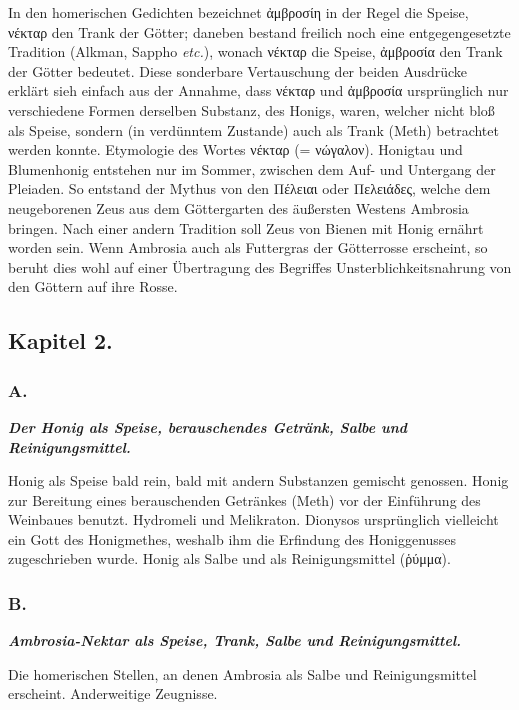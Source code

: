 \documentclass[a4paper, 11pt, oneside]{article}
\begin{document}
In den homerischen Gedichten bezeichnet ἀμβροσίη in der Regel die Speise, νέκταρ den Trank der Götter; daneben bestand freilich noch eine entgegengesetzte Tradition (Alkman, Sappho \emph{etc.}), wonach νέκταρ die Speise, ἀμβροσία den Trank der Götter bedeutet. Diese sonderbare Vertauschung der beiden Ausdrücke erklärt sieh einfach aus der Annahme, dass νέκταρ und ἀμβροσία ursprünglich nur verschiedene Formen derselben Substanz, des Honigs, waren, welcher nicht bloß als Speise, sondern (in verdünntem Zustande) auch als Trank (Meth) betrachtet werden konnte. Etymologie des Wortes νέκταρ (= νώγαλον). Honigtau und Blumenhonig entstehen nur im Sommer, zwischen dem Auf- und Untergang der Pleiaden. So entstand der Mythus von den Πέλειαι oder Πελειάδες, welche dem neugeborenen Zeus aus dem Göttergarten des äußersten Westens Ambrosia bringen. Nach einer andern Tradition soll Zeus von Bienen mit Honig ernährt worden sein. Wenn Ambrosia auch als Futtergras der Götterrosse erscheint, so beruht dies wohl auf einer Übertragung des Begriffes Unsterblichkeitsnahrung von den Göttern auf ihre Rosse.

\subsection*{Kapitel 2.}

\subsubsection*{A.}

\textbf{\emph{Der Honig als Speise, berauschendes Getränk, Salbe und Reinigungsmittel.}}

Honig als Speise bald rein, bald mit andern Substanzen gemischt genossen. Honig zur Bereitung eines berauschenden Getränkes (Meth) vor der Einführung des Weinbaues benutzt. Hydromeli und Melikraton. Dionysos ursprünglich vielleicht ein Gott des Honigmethes, weshalb ihm die Erfindung des Honiggenusses zugeschrieben wurde. Honig als Salbe und als Reinigungsmittel (ῥύμμα).

\subsubsection*{B.}

\textbf{\emph{Ambrosia-Nektar als Speise, Trank, Salbe und Reinigungsmittel.}}

Die homerischen Stellen, an denen Ambrosia als Salbe und Reinigungsmittel erscheint. Anderweitige Zeugnisse.
\end{document}
